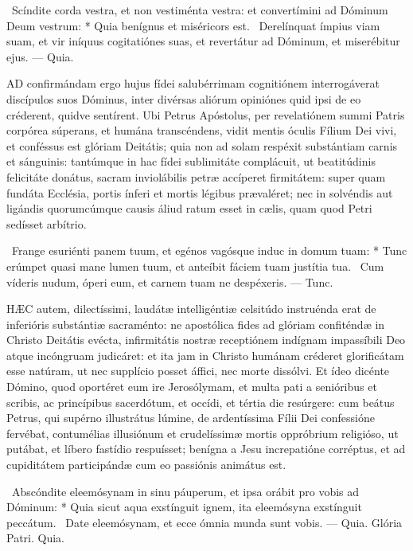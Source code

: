 \R\ Scíndite corda vestra, et non vestiménta vestra: et convertímini ad Dóminum Deum vestrum: * Quia benígnus et miséricors est. \V\ Derelínquat ímpius viam suam, et vir iníquus cogitatiónes suas, et revertátur ad Dóminum, et miserébitur ejus. --- Quia.


\lettrine[lines=2]{A}{D} confirmándam ergo hujus fídei salubérrimam cognitiónem interrogáverat discípulos suos Dóminus, inter divérsas aliórum opiniónes quid ipsi de eo créderent, quidve sentírent. Ubi Petrus Apóstolus, per revelatiónem summi Patris corpórea súperans, et humána transcéndens, vidit mentis óculis Fílium Dei vivi, et conféssus est glóriam Deitátis; quia non ad solam respéxit substántiam carnis et sánguinis: tantúmque in hac fídei sublimitáte complácuit, ut beatitúdinis felicitáte donátus, sacram inviolábilis petræ accíperet firmitátem: super quam fundáta Ecclésia, portis ínferi et mortis légibus prævaléret; nec in solvéndis aut ligándis quorumcúmque causis áliud ratum esset in cælis, quam quod Petri sedísset arbítrio.

\R\ Frange esuriénti panem tuum, et egénos vagósque induc in domum tuam: * Tunc erúmpet quasi mane lumen tuum, et anteíbit fáciem tuam justítia tua. \V\ Cum víderis nudum, óperi eum, et carnem tuam ne despéxeris. --- Tunc.


\lettrine[lines=2]{H}{ÆC} autem, dilectíssimi, laudátæ intelligéntiæ celsitúdo instruénda erat de inferióris substántiæ sacraménto: ne apostólica fides ad glóriam confiténdæ in Christo Deitátis evécta, infirmitátis nostræ receptiónem indígnam impassíbili Deo atque incóngruam judicáret: et ita jam in Christo humánam créderet glorificátam esse natúram, ut nec supplício posset áffici, nec morte dissólvi. Et ídeo dicénte Dómino, quod oportéret eum ire Jerosólymam, et multa pati a senióribus et scribis, ac princípibus sacerdótum, et occídi, et tértia die resúrgere: cum beátus Petrus, qui supérno illustrátus lúmine, de ardentíssima Fílii Dei confessióne fervébat, contumélias illusiónum et crudelíssimæ mortis oppróbrium religióso, ut putábat, et líbero fastídio respuísset; benígna a Jesu increpatióne corréptus, et ad cupiditátem participándæ cum eo passiónis animátus est.

\R\ Abscóndite eleemósynam in sinu páuperum, et ipsa orábit pro vobis ad Dóminum: * Quia sicut aqua exstínguit ignem, ita eleemósyna exstínguit peccátum. \V\ Date eleemósynam, et ecce ómnia munda sunt vobis. --- Quia. Glória Patri. Quia.

